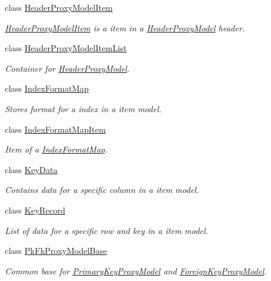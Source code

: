 \begin{DoxyCompactItemize}
class \hyperlink{class_mdt_1_1_item_model_1_1_header_proxy_model_item}{Header\+Proxy\+Model\+Item}
\begin{DoxyCompactList}\small\item\em \hyperlink{class_mdt_1_1_item_model_1_1_header_proxy_model_item}{Header\+Proxy\+Model\+Item} is a item in a \hyperlink{class_mdt_1_1_item_model_1_1_header_proxy_model}{Header\+Proxy\+Model} header. \end{DoxyCompactList}\item 
class \hyperlink{class_mdt_1_1_item_model_1_1_header_proxy_model_item_list}{Header\+Proxy\+Model\+Item\+List}
\begin{DoxyCompactList}\small\item\em Container for \hyperlink{class_mdt_1_1_item_model_1_1_header_proxy_model}{Header\+Proxy\+Model}. \end{DoxyCompactList}\item 
class \hyperlink{class_mdt_1_1_item_model_1_1_index_format_map}{Index\+Format\+Map}
\begin{DoxyCompactList}\small\item\em Stores format for a index in a item model. \end{DoxyCompactList}\item 
class \hyperlink{class_mdt_1_1_item_model_1_1_index_format_map_item}{Index\+Format\+Map\+Item}
\begin{DoxyCompactList}\small\item\em Item of a \hyperlink{class_mdt_1_1_item_model_1_1_index_format_map}{Index\+Format\+Map}. \end{DoxyCompactList}\item 
class \hyperlink{class_mdt_1_1_item_model_1_1_key_data}{Key\+Data}
\begin{DoxyCompactList}\small\item\em Contains data for a specific column in a item model. \end{DoxyCompactList}\item 
class \hyperlink{class_mdt_1_1_item_model_1_1_key_record}{Key\+Record}
\begin{DoxyCompactList}\small\item\em List of data for a specific row and key in a item model. \end{DoxyCompactList}\item 
class \hyperlink{class_mdt_1_1_item_model_1_1_pk_fk_proxy_model_base}{Pk\+Fk\+Proxy\+Model\+Base}
\begin{DoxyCompactList}\small\item\em Common base for \hyperlink{class_mdt_1_1_item_model_1_1_primary_key_proxy_model}{Primary\+Key\+Proxy\+Model} and \hyperlink{class_mdt_1_1_item_model_1_1_foreign_key_proxy_model}{Foreign\+Key\+Proxy\+Model}. \end{DoxyCompactList}\item 

\end{DoxyCompactItemize}
